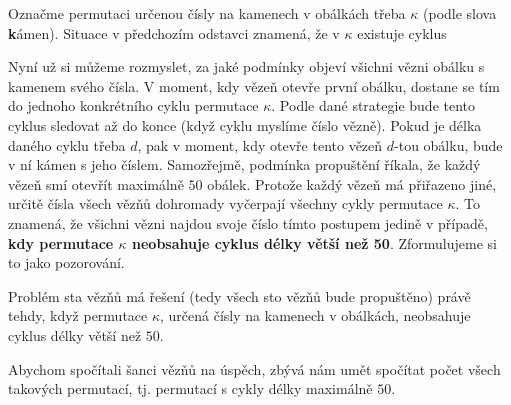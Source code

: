 Označme permutaci určenou čísly na kamenech v obálkách třeba $\kappa$ (podle
slova \textbf{k}ámen). Situace v předchozím odstavci znamená, že v $\kappa$
existuje cyklus
\begin{center}
\end{center}

Nyní už si můžeme rozmyslet, za jaké podmínky objeví všichni vězni obál\-ku s
kamenem svého čísla. V moment, kdy vězeň otevře první obálku, dostane se tím do
jednoho konkrétního cyklu permutace $\kappa$. Podle dané strategie bude tento
cyklus sledovat až do konce (když  cyklu myslíme číslo vězně).
Pokud je délka daného cyklu třeba $d$, pak v moment, kdy otevře tento vězeň
$d$-tou obálku, bude v ní kámen s jeho číslem. Samozřejmě, podmínka propuštění
říkala, že každý vězeň smí otevřít maximálně $50$ obálek. Protože každý vězeň má
přiřazeno jiné, určitě čísla všech vězňů dohromady vyčerpají všechny cykly
permutace $\kappa$. To znamená, že všichni vězni najdou svoje číslo tímto
postupem jedině v případě, \textbf{kdy permutace $\kappa$ neobsahuje cyklus
délky větší než 50}. Zformulujeme si to jako pozorování.

\begin{observation}
 Problém sta vězňů má řešení (tedy všech sto vězňů bude propuštěno) právě tehdy,
 když permutace $\kappa$, určená čísly na kamenech v obálkách, neobsahuje cyklus
 délky větší než $50$.
\end{observation}

Abychom spočítali šanci vězňů na úspěch, zbývá nám umět spočítat počet všech
takových permutací, tj. permutací s cykly délky maximálně $50$.

